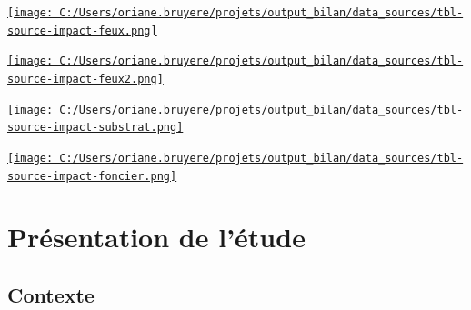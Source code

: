 \documentclass[
  11pt,
  letterpaper,
]{scrreprt}
\begin{document}
\recalctypearea

\newpage
{}

\href{C:/Users/oriane.bruyere/projets/output_bilan/data_sources/tbl-source-impact-feux.html}{\texttt{[image: C:/Users/oriane.bruyere/projets/output\_bilan/data\_sources/tbl-source-impact-feux.png]}}

\href{C:/Users/oriane.bruyere/projets/output_bilan/data_sources/tbl-source-impact-feux2.html}{\texttt{[image: C:/Users/oriane.bruyere/projets/output\_bilan/data\_sources/tbl-source-impact-feux2.png]}}

\href{C:/Users/oriane.bruyere/projets/output_bilan/data_sources/tbl-source-impact-substrat.html}{\texttt{[image: C:/Users/oriane.bruyere/projets/output\_bilan/data\_sources/tbl-source-impact-substrat.png]}}

\href{C:/Users/oriane.bruyere/projets/output_bilan/data_sources/tbl-source-impact-foncier.html}{\texttt{[image: C:/Users/oriane.bruyere/projets/output\_bilan/data\_sources/tbl-source-impact-foncier.png]}}

\newpage{}

\recalctypearea

\newpage
{}


\chapter{Présentation de l'étude}\label{pruxe9sentation-de-luxe9tude}

\section{Contexte}\label{sec-contexte}
\end{document}
